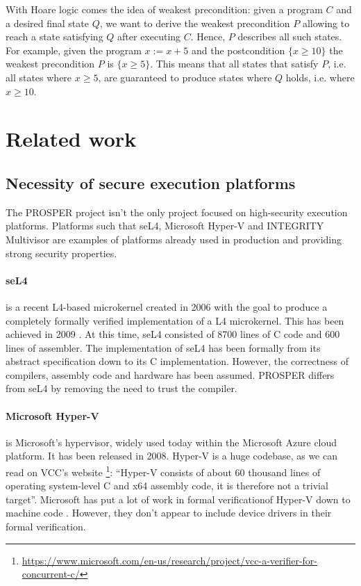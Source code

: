 \documentclass{kththesis}
\begin{document}
With Hoare logic comes the idea of weakest precondition: given a program $C$ and
a desired final state $Q$, we want to derive the weakest precondition $P$
allowing to reach a state satisfying $Q$ after executing $C$. Hence, $P$
describes all such states. For example, given the program $x:=x+5$ and the
postcondition $\{x \geq 10\}$ the weakest precondition $P$ is $\{x \geq 5\}$.
This means that all states that satisfy $P$, i.e. all states where $x \geq 5$,
are guaranteed to produce states where $Q$ holds, i.e. where $x \geq 10$.

\section{Related work}

\subsection{Necessity of secure execution platforms}

The PROSPER project isn't the only project focused on high-security execution
platforms. Platforms such that seL4, Microsoft Hyper-V and INTEGRITY Multivisor
are examples of platforms already used in production and providing strong
security properties.

\paragraph{seL4} is a recent L4-based microkernel created in 2006 with the goal
to produce a completely formally verified implementation of a L4 microkernel.
This has been achieved in 2009 \cite{klein_sel4:_2009}. At this time, seL4
consisted of \num{8700} lines of C code and \num{600} lines of assembler. The
implementation of seL4 has been formally from its abstract specification down to
its C implementation. However, the correctness of compilers, assembly code and
hardware has been assumed. PROSPER differs from seL4 by removing the need to
trust the compiler.

\paragraph{Microsoft Hyper-V} is Microsoft's hypervisor, widely used today
within the Microsoft Azure cloud platform. It has been released in 2008. Hyper-V
is a huge codebase, as we can read on VCC's website
\footnote{\url{https://www.microsoft.com/en-us/research/project/vcc-a-verifier-for-concurrent-c/}}:
``Hyper-V consists of about 60 thousand lines of operating system-level C and
x64 assembly code, it is therefore not a trivial target''. Microsoft has put a
lot of work in formal verification\footnotemark of Hyper-V down to machine code
\cite{leinenbach_verifying_2009}. However, they don't appear to include device
drivers in their formal verification.
\end{document}
